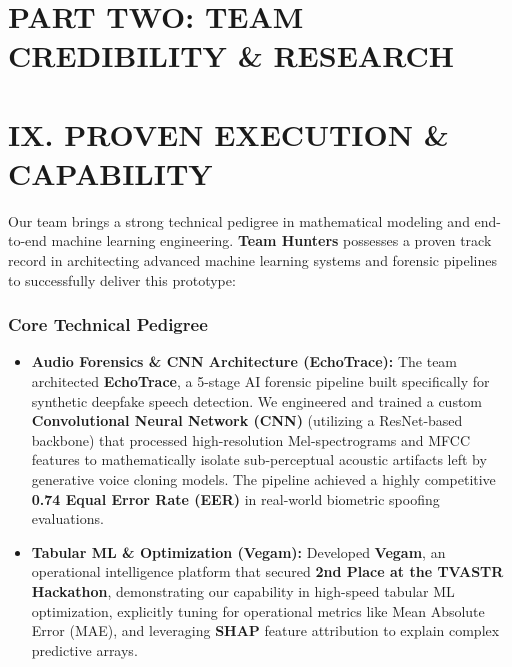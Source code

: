 \documentclass[10pt,a4paper]{article}
\begin{document}
\section*{PART TWO: TEAM CREDIBILITY \& RESEARCH}

\section{IX. PROVEN EXECUTION \& CAPABILITY}

Our team brings a strong technical pedigree in mathematical modeling and end-to-end machine learning engineering. \textbf{Team Hunters} possesses a proven track record in architecting advanced machine learning systems and forensic pipelines to successfully deliver this prototype:

\subsubsection*{Core Technical Pedigree}
\begin{itemize}
  \item \textbf{Audio Forensics \& CNN Architecture (EchoTrace):} The team architected \textbf{EchoTrace}, a 5-stage AI forensic pipeline built specifically for synthetic deepfake speech detection. We engineered and trained a custom \textbf{Convolutional Neural Network (CNN)} (utilizing a ResNet-based backbone) that processed high-resolution Mel-spectrograms and MFCC features to mathematically isolate sub-perceptual acoustic artifacts left by generative voice cloning models. The pipeline achieved a highly competitive \textbf{0.74 Equal Error Rate (EER)} in real-world biometric spoofing evaluations.
  \item \textbf{Tabular ML \& Optimization (Vegam):} Developed \textbf{Vegam}, an operational intelligence platform that secured \textbf{2nd Place at the TVASTR Hackathon}, demonstrating our capability in high-speed tabular ML optimization, explicitly tuning for operational metrics like Mean Absolute Error (MAE), and leveraging \textbf{SHAP} feature attribution to explain complex predictive arrays.
\end{itemize}

\end{document}
